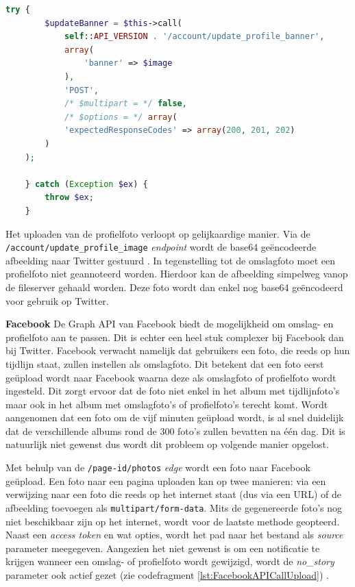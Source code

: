 \begin{lstlisting}[caption={Uploaden van omslagfoto naar Twitter},label=lst:TwitterAPICall,language=PHP]
	try {
		$updateBanner = $this->call(
			self::API_VERSION . '/account/update_profile_banner',
			array(
				'banner' => $image
			),
			'POST',
			/* $multipart = */ false,
			/* $options = */ array(
			'expectedResponseCodes' => array(200, 201, 202)
		)
	);
	
	} catch (Exception $ex) {
		throw $ex;
	}
\end{lstlisting}

Het uploaden van de profielfoto verloopt op gelijkaardige manier. Via de \texttt{/account/update{\_}profile{\_}image} \textit{endpoint} wordt de base64 ge\"{e}ncodeerde afbeelding naar Twitter gestuurd \cite{TwitterAPIDoc}. In tegenstelling tot de omslagfoto moet een profielfoto niet geannoteerd worden. Hierdoor kan de afbeelding simpelweg vanop de fileserver gehaald worden. Deze foto wordt dan enkel nog base64 ge\"{e}ncodeerd voor gebruik op Twitter.

\textbf{Facebook} \break
De Graph API van Facebook biedt de mogelijkheid om omslag- en profielfoto aan te passen. Dit is echter een heel stuk complexer bij Facebook dan bij Twitter. %
Facebook verwacht namelijk dat gebruikers een foto, die reeds op hun tijdlijn staat, zullen instellen als omslagfoto. Dit betekent dat een foto eerst ge\"{u}pload wordt naar Facebook waarna deze als omslagfoto of profielfoto wordt ingesteld. Dit zorgt ervoor dat de foto niet enkel in het album met tijdlijnfoto's maar ook in het album met omslagfoto's of profielfoto's terecht komt. Wordt aangenomen dat een foto om de vijf minuten ge\"{u}pload wordt, is al snel duidelijk dat de verschillende albums rond de 300 foto's zullen bevatten na \'{e}\'{e}n dag. Dit is natuurlijk niet gewenst dus wordt dit probleem op volgende manier opgelost. %

Met behulp van de \texttt{/page-id/photos} \textit{edge} wordt een foto naar Facebook ge\"{u}pload. Een foto naar een pagina uploaden kan op twee manieren: via een verwijzing naar een foto die reeds op het internet staat (dus via een URL) of de afbeelding toevoegen als \texttt{multipart/form-data}. Mits de gegenereerde foto's nog niet beschikbaar zijn op het internet, wordt voor de laatste methode geopteerd. Naast een \textit{access token} en wat opties, wordt het pad naar het bestand als \textit{source} parameter meegegeven. Aangezien het niet gewenst is om een notificatie te krijgen wanneer een omslag- of profielfoto wordt gewijzigd, wordt de \textit{no{\_}story} parameter ook actief gezet (zie codefragment \ref{lst:FacebookAPICallUpload}) \cite{FacebookPagePhotos}. 

